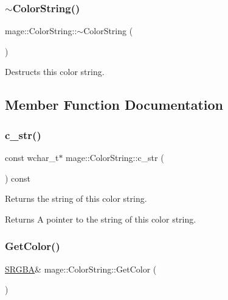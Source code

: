 \subsubsection{\texorpdfstring{$\sim$\+Color\+String()}{~ColorString()}}
{\footnotesize\ttfamily mage\+::\+Color\+String\+::$\sim$\+Color\+String (\begin{DoxyParamCaption}{ }\end{DoxyParamCaption})\hspace{0.3cm}{\ttfamily [default]}}

Destructs this color string. 

\subsection{Member Function Documentation}
\hypertarget{classmage_1_1_color_string_af2241b81cac59051e9ebf0ddefe719ed}{}\label{classmage_1_1_color_string_af2241b81cac59051e9ebf0ddefe719ed} 
\subsubsection{\texorpdfstring{c\+\_\+str()}{c\_str()}}
{\footnotesize\ttfamily const wchar\+\_\+t$\ast$ mage\+::\+Color\+String\+::c\+\_\+str (\begin{DoxyParamCaption}{ }\end{DoxyParamCaption}) const\hspace{0.3cm}{\ttfamily [noexcept]}}

Returns the string of this color string.

\begin{DoxyReturn}{Returns}
A pointer to the string of this color string. 
\end{DoxyReturn}
\hypertarget{classmage_1_1_color_string_a524e8a66e94a353724c45728e3b73dc1}{}\label{classmage_1_1_color_string_a524e8a66e94a353724c45728e3b73dc1} 
\subsubsection{\texorpdfstring{Get\+Color()}{GetColor()}\hspace{0.1cm}{\footnotesize\ttfamily [1/2]}}
{\footnotesize\ttfamily \hyperlink{structmage_1_1_s_r_g_b_a}{S\+R\+G\+BA}\& mage\+::\+Color\+String\+::\+Get\+Color (\begin{DoxyParamCaption}{ }\end{DoxyParamCaption})\hspace{0.3cm}{\ttfamily [noexcept]}}


